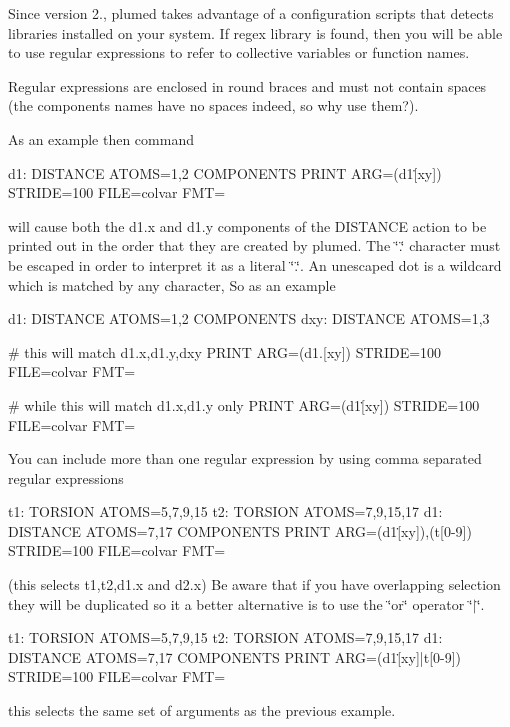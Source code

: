 Since version 2., plumed takes advantage of a configuration scripts that detects libraries installed on your system. If regex library is found, then you will be able to use regular expressions to refer to collective variables or function names.

Regular expressions are enclosed in round braces and must not contain spaces (the components names have no spaces indeed, so why use them?).

As an example then command \begin{DoxyVerb}d1: DISTANCE ATOMS=1,2 COMPONENTS
PRINT ARG=(d1\.[xy])   STRIDE=100 FILE=colvar FMT=%
\end{DoxyVerb}
 will cause both the d1.\+x and d1.\+y components of the D\+I\+S\+T\+A\+N\+C\+E action to be printed out in the order that they are created by plumed. The \char`\"{}.\char`\"{} character must be escaped in order to interpret it as a literal \char`\"{}.\char`\"{}. An unescaped dot is a wildcard which is matched by any character, So as an example \begin{DoxyVerb}d1: DISTANCE ATOMS=1,2 COMPONENTS
dxy: DISTANCE ATOMS=1,3

# this will match d1.x,d1.y,dxy
PRINT ARG=(d1.[xy])   STRIDE=100 FILE=colvar FMT=%

# while this will match d1.x,d1.y only
PRINT ARG=(d1\.[xy])   STRIDE=100 FILE=colvar FMT=%
\end{DoxyVerb}


You can include more than one regular expression by using comma separated regular expressions

\begin{DoxyVerb}t1: TORSION ATOMS=5,7,9,15
t2: TORSION ATOMS=7,9,15,17
d1: DISTANCE ATOMS=7,17 COMPONENTS
PRINT ARG=(d1\.[xy]),(t[0-9]) STRIDE=100 FILE=colvar FMT=%
\end{DoxyVerb}


(this selects t1,t2,d1.\+x and d2.\+x) Be aware that if you have overlapping selection they will be duplicated so it a better alternative is to use the \char`\"{}or\char`\"{} operator \char`\"{}$\vert$\char`\"{}.

\begin{DoxyVerb}t1: TORSION ATOMS=5,7,9,15
t2: TORSION ATOMS=7,9,15,17
d1: DISTANCE ATOMS=7,17 COMPONENTS
PRINT ARG=(d1\.[xy]|t[0-9]) STRIDE=100 FILE=colvar FMT=%
\end{DoxyVerb}


this selects the same set of arguments as the previous example.

